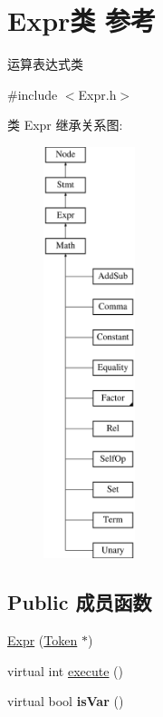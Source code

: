 \hypertarget{class_expr}{}\section{Expr类 参考}
\label{class_expr}


运算表达式类  




{\ttfamily \#include $<$Expr.\+h$>$}

类 Expr 继承关系图\+:\begin{figure}[H]
\begin{center}
\leavevmode
\includegraphics[height=12.000000cm]{class_expr}
\end{center}
\end{figure}
\subsection*{Public 成员函数}
\begin{DoxyCompactItemize}
\item 
\hyperlink{class_expr_a5a045d68e601c2e782e1958d55a07400}{Expr} (\hyperlink{class_token}{Token} $\ast$)
\item 
virtual int \hyperlink{class_expr_aff6a2e6eaa460e2a3db28ebdab089b51}{execute} ()
\item 
\mbox{\label{class_expr_add2b30644dd850c4bfa2d619d20d8c09}} 
virtual bool {\bfseries is\+Var} ()
\end{DoxyCompactItemize}
